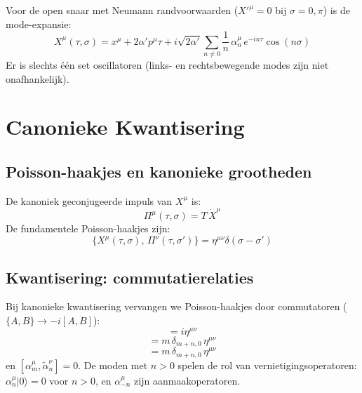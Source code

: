 \documentclass[12pt,a4paper]{article}
\begin{document}
            Voor de open snaar met Neumann randvoorwaarden ($X'^\mu = 0$ bij $\sigma = 0, \pi$) is de mode-expansie:
            \begin{equation}
                X^\mu(\tau,\sigma) = x^\mu + 2\alpha' p^\mu\tau + i\sqrt{2\alpha'}\sum_{n\neq 0}\frac{1}{n}\,\alpha_n^\mu\,e^{-in\tau}\cos(n\sigma)
            \end{equation}
            Er is slechts \'e\'en set oscillatoren (links- en rechtsbewegende modes zijn niet onafhankelijk).

    \section{Canonieke Kwantisering}

        \subsection{Poisson-haakjes en kanonieke grootheden}

            De kanoniek geconjugeerde impuls van $X^\mu$ is:
            \begin{equation}
                \Pi^\mu(\tau,\sigma) = T\,\dot X^\mu
            \end{equation}
            De fundamentele Poisson-haakjes zijn:
            \begin{equation}
                \{X^\mu(\tau,\sigma),\,\Pi^\nu(\tau,\sigma')\} = \eta^{\mu\nu}\delta(\sigma-\sigma')
            \end{equation}

        \subsection{Kwantisering: commutatierelaties}

            Bij kanonieke kwantisering vervangen we Poisson-haakjes door commutatoren ($\{A,B\} \to -i[A,B]$):
            \begin{equation}
                [x^\mu,\,p^\nu] = i\eta^{\mu\nu}
            \end{equation}
            \begin{equation}
                [\alpha_m^\mu,\,\alpha_n^\nu] = m\,\delta_{m+n,0}\,\eta^{\mu\nu}
                \label{eq:comm_alpha}
            \end{equation}
            \begin{equation}
                [\tilde\alpha_m^\mu,\,\tilde\alpha_n^\nu] = m\,\delta_{m+n,0}\,\eta^{\mu\nu}
            \end{equation}
            en $[\alpha_m^\mu,\tilde\alpha_n^\nu] = 0$. De moden met $n > 0$ spelen de rol van vernietigingsoperatoren: $\alpha_n^\mu|0\rangle = 0$ voor $n > 0$, en $\alpha_{-n}^\mu$ zijn aanmaakoperatoren.
\end{document}
